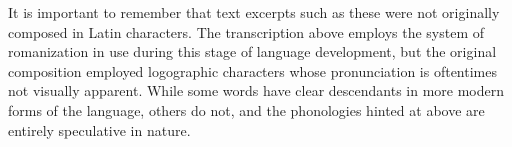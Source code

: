 It is important to remember that text excerpts such as these were not originally composed in Latin characters.
The transcription above employs the system of romanization in use during this stage of language development, but the original composition employed logographic characters whose pronunciation is oftentimes not visually apparent.
While some words have clear descendants in more modern forms of the language, others do not, and the phonologies hinted at above are entirely speculative in nature.
